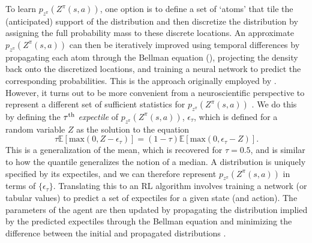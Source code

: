 To learn $p_{z^\pi}(Z^\pi(s, a))$, one option is to define a set of `atoms' that tile the (anticipated) support of the distribution and then discretize the distribution by assigning the full probability mass to these discrete locations.
An approximate $p_{z^\pi}(Z^\pi(s, a))$ can then be iteratively improved using temporal differences by propagating each atom through the Bellman equation (), projecting the density back onto the discretized locations, and training a neural network to predict the corresponding probabilities.
This is the approach originally employed by \citet{bellemare2017distributional}.
However, it turns out to be more convenient from a neuroscientific perspective to represent a different set of sufficient statistics for $p_{z^\pi}(Z^\pi(s, a))$ \citep{dabney2020distributional,lowet2020distributional}.
We do this by defining the $\tau\textsuperscript{th}$ \emph{expectile} of $p_{z^\pi}(Z^\pi(s, a))$, $\epsilon_\tau$, which is defined for a random variable $Z$ as the solution to the equation
\begin{equation}
    \tau \mathbb{E} [\text{max}(0, Z - \epsilon_\tau)] = (1-\tau) \mathbb{E} [\text{max}(0, \epsilon_\tau - Z)].
\end{equation}
This is a generalization of the mean, which is recovered for $\tau = 0.5$, and is similar to how the quantile generalizes the notion of a median.
A distribution is uniquely specified by its expectiles, and we can therefore represent $p_{z^\pi}(Z^\pi(s, a))$ in terms of $\{\epsilon_\tau\}$.
Translating this to an RL algorithm involves training a network (or tabular values) to predict a set of expectiles for a given state (and action).
The parameters of the agent are then updated by propagating the distribution implied by the predicted expectiles through the Bellman equation and minimizing the difference between the initial and propagated distributions \citep{bellemare2023distributional}.

